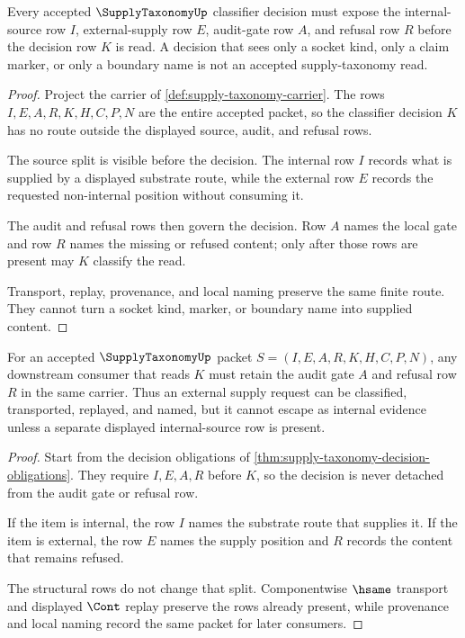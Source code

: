 \begin{theorem}
\label{thm:supply-taxonomy-decision-obligations}
Every accepted $\SupplyTaxonomyUp$ classifier decision must expose the internal-source row $I$, external-supply row $E$, audit-gate row $A$, and refusal row $R$ before the decision row $K$ is read. A decision that sees only a socket kind, only a claim marker, or only a boundary name is not an accepted supply-taxonomy read.
\end{theorem}
\begin{proof}
Project the carrier of \autoref{def:supply-taxonomy-carrier}. The rows $I,E,A,R,K,H,C,P,N$ are the entire accepted packet, so the classifier decision $K$ has no route outside the displayed source, audit, and refusal rows.

The source split is visible before the decision. The internal row $I$ records what is supplied by a displayed substrate route, while the external row $E$ records the requested non-internal position without consuming it.

The audit and refusal rows then govern the decision. Row $A$ names the local gate and row $R$ names the missing or refused content; only after those rows are present may $K$ classify the read.

Transport, replay, provenance, and local naming preserve the same finite route. They cannot turn a socket kind, marker, or boundary name into supplied content.
\end{proof}

\begin{theorem}
\label{thm:supply-taxonomy-audit-refusal-nonescape}
For an accepted $\SupplyTaxonomyUp$ packet $S=(I,E,A,R,K,H,C,P,N)$, any downstream consumer that reads $K$ must retain the audit gate $A$ and refusal row $R$ in the same carrier. Thus an external supply request can be classified, transported, replayed, and named, but it cannot escape as internal evidence unless a separate displayed internal-source row is present.
\end{theorem}
\begin{proof}
Start from the decision obligations of \autoref{thm:supply-taxonomy-decision-obligations}. They require $I,E,A,R$ before $K$, so the decision is never detached from the audit gate or refusal row.

If the item is internal, the row $I$ names the substrate route that supplies it. If the item is external, the row $E$ names the supply position and $R$ records the content that remains refused.

The structural rows do not change that split. Componentwise $\hsame$ transport and displayed $\Cont$ replay preserve the rows already present, while provenance and local naming record the same packet for later consumers.
\end{proof}

